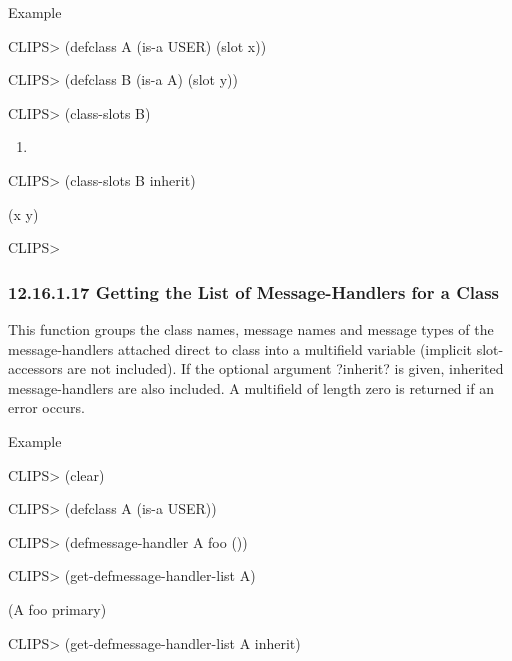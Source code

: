 \documentclass[letterpaper,10pt,english]{sphinxmanual}
\begin{document}
Example

CLIPS\textgreater{} (defclass A (is-a USER) (slot x))

CLIPS\textgreater{} (defclass B (is-a A) (slot y))

CLIPS\textgreater{} (class-slots B)
\begin{enumerate}
\def\theenumi{\alph{enumi}}
\def\labelenumi{(\theenumi )}
\makeatletter\def\p@enumii{\p@enumi (\theenumi )}\makeatother
\setcounter{enumi}{24}
\item {} 
\end{enumerate}

CLIPS\textgreater{} (class-slots B inherit)

(x y)

CLIPS\textgreater{}


\subsubsection{12.16.1.17 Getting the List of Message-Handlers for a Class}
\label{\detokenize{actions:getting-the-list-of-message-handlers-for-a-class}}
This function groups the class names, message names and message types of
the message-handlers attached direct to class into a multifield variable
(implicit slot-accessors are not included). If the optional argument
?inherit? is given, inherited message-handlers are also included. A
multifield of length zero is returned if an error occurs.


\begin{sphinxVerbatim}[commandchars=\\\{\}]
  \PYG{p}{[}\PYG{p}{]}
\end{sphinxVerbatim}

Example

CLIPS\textgreater{} (clear)

CLIPS\textgreater{} (defclass A (is-a USER))

CLIPS\textgreater{} (defmessage-handler A foo ())

CLIPS\textgreater{} (get-defmessage-handler-list A)

(A foo primary)

CLIPS\textgreater{} (get-defmessage-handler-list A inherit)
\end{document}
